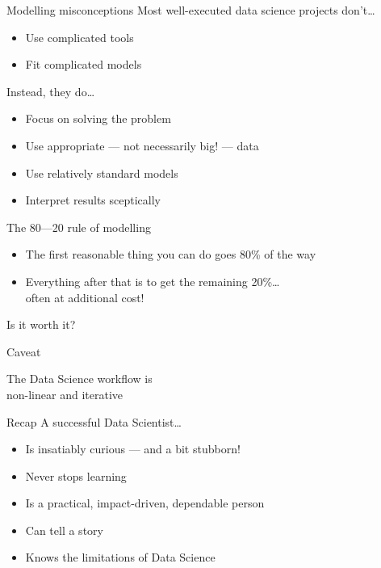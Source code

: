 \begin{frame}{Modelling misconceptions}
    Most well\hyp{}executed data science projects don't\ldots\vspace{-1ex}
    \begin{itemize}
        \item Use complicated tools
        \item Fit complicated models
    \end{itemize}
    \vfill
    Instead, they do\ldots\vspace{-1ex}
    \begin{itemize}
        \item \alert{Focus on solving the problem}
        \item Use appropriate --- not necessarily big! --- data
        \item Use relatively standard models
        \item Interpret results sceptically
    \end{itemize}
\end{frame}

\begin{frame}{The 80---20 rule of modelling}
    \begin{itemize}
        \item The first \alert{reasonable} thing you can do goes 80\% of the way
        \item Everything after that is to get the remaining 20\%\ldots \\
              often at additional cost!
    \end{itemize}
    \vfill\pause
    \begin{center}
        \LARGE%
        Is it worth it?
    \end{center}
\end{frame}

\begin{frame}{Caveat}
    \begin{center}
        {\Large%
         The Data Science workflow is} \\[\bigskipamount]
        {\LARGE%
         \alert{non\hyp{}linear} and \alert{iterative}} \\[2\bigskipamount]
    \end{center}
\end{frame}

\begin{frame}{Recap}
    A successful Data Scientist\ldots
    \begin{itemize}
        \item Is insatiably curious --- and a bit stubborn!
        \item Never stops learning
        \item Is a practical, impact\hyp{}driven, dependable person
        \item Can tell a story
        \item Knows the limitations of Data Science
    \end{itemize}
\end{frame}

